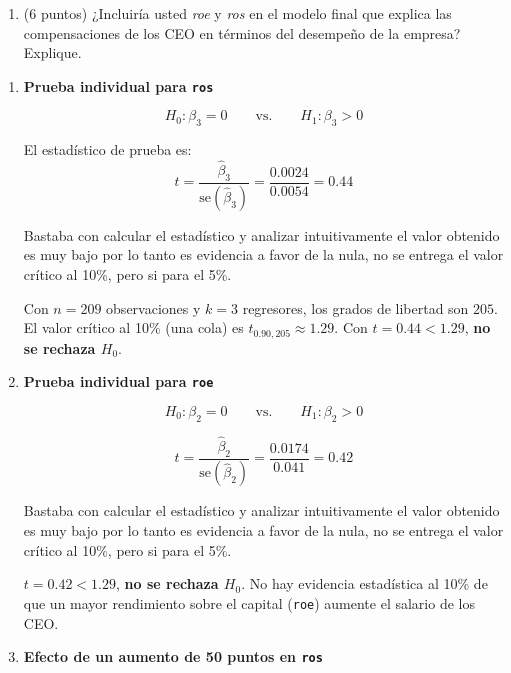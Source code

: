 \documentclass[10pt,a4paper]{article}
\begin{document}
\begin{enumerate}
\begin{enumerate}
\[
\widehat{\log(\text{salary})}
= 4.82 \;+\; 0.50\,\log(\text{sales}) 
\]
\[
\qquad\qquad \qquad(0.22)\qquad \qquad(0.015)
\]
\[
n = 209,\qquad R^2 = 0.279.
\]


 ($
F_{0.90}(2,205)\approx 2.35,
\quad
F_{0.95}(2,205)\approx 3.04.
$)

\item (6 puntos)  ¿Incluiría usted \textit{roe} y \textit{ros} en el modelo final que explica las compensaciones de los CEO en términos del desempeño de la empresa? Explique.
\end{enumerate}

{\color{blue} \begin{enumerate}
\item \textbf{Prueba individual para \texttt{ros}}

\[
H_0: \beta_3 = 0 \qquad \text{vs.} \qquad H_1: \beta_3 > 0
\]

El estadístico de prueba es:
\[
t = \frac{\hat{\beta}_3}{\text{se}(\hat{\beta}_3)} = \frac{0.0024}{0.0054} = 0.44
\]

  
 Bastaba con calcular el estadístico y  analizar intuitivamente el valor obtenido es muy bajo por lo tanto es evidencia a favor de la nula, no se entrega el valor crítico al 10\%, pero si para el 5\%.  
 
Con $n=209$ observaciones y $k=3$ regresores, los grados de libertad son $205$.
El valor crítico al 10\% (una cola) es $t_{0.90,205} \approx 1.29$.
Con $t=0.44 < 1.29$, \textbf{no se rechaza $H_0$}.  


\item \textbf{Prueba individual para \texttt{roe}}

\[
H_0: \beta_2 = 0 \qquad \text{vs.} \qquad H_1: \beta_2 > 0
\]

\[
t = \frac{\hat{\beta}_2}{\text{se}(\hat{\beta}_2)} = \frac{0.0174}{0.041} = 0.42
\]

Bastaba con calcular el estadístico y  analizar intuitivamente el valor obtenido es muy bajo por lo tanto es evidencia a favor de la nula, no se entrega el valor crítico al 10\%, pero si para el 5\%.  

 $t = 0.42 < 1.29$, \textbf{no se rechaza $H_0$}.  
No hay evidencia estadística al 10\% de que un mayor rendimiento sobre el capital (\texttt{roe}) aumente el salario de los CEO.

\item \textbf{Efecto de un aumento de 50 puntos en \texttt{ros}}


\end{enumerate}}
\end{enumerate}
\end{document}
